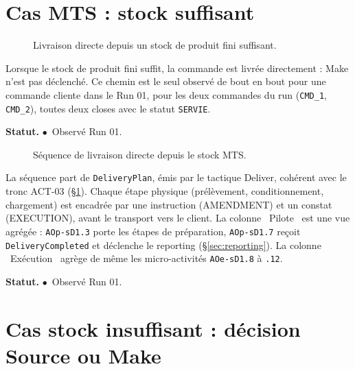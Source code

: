 \documentclass[11pt,a4paper]{article}
\newcommand{\code}[1]{\texttt{#1}}
\newcommand{\stRUN}{\ensuremath{\bullet}~Observé Run 01}
\newcommand{\statut}[1]{\textbf{Statut.} #1}
\begin{document}
\section{Cas MTS : stock suffisant}
\label{sec:mts}

\begin{figure}[H]
\centering

\caption{Livraison directe depuis un stock de produit fini suffisant.}
\label{fig:act03}
\end{figure}

Lorsque le stock de produit fini suffit, la commande est livrée directement : Make n'est pas déclenché. Ce chemin est le seul observé de bout en bout pour une commande cliente dans le Run 01, pour les deux commandes du run (\code{CMD\_1}, \code{CMD\_2}), toutes deux closes avec le statut \code{SERVIE}.

\statut{\stRUN.}

\begin{landscape}
\begin{figure}[p]
\centering
\resizebox{\linewidth}{!}{}
\caption{Séquence de livraison directe depuis le stock MTS.}
\label{fig:seq02}
\end{figure}
\end{landscape}

La séquence part de \code{DeliveryPlan}, émis par le tactique Deliver, cohérent avec le tronc ACT-03 (\S\ref{sec:mts}). Chaque étape physique (prélèvement, conditionnement, chargement) est encadrée par une instruction (AMENDMENT) et un constat (EXECUTION), avant le transport vers le client. La colonne \og{}~Pilote~\fg{} est une vue agrégée : \code{AOp-sD1.3} porte les étapes de préparation, \code{AOp-sD1.7} reçoit \code{DeliveryCompleted} et déclenche le reporting (\S\ref{sec:reporting}). La colonne \og{}~Exécution~\fg{} agrège de même les micro-activités \code{AOe-sD1.8} à \code{.12}.

\statut{\stRUN.}

\section{Cas stock insuffisant : décision Source ou Make}
\label{sec:stock-insuffisant}
\end{document}
